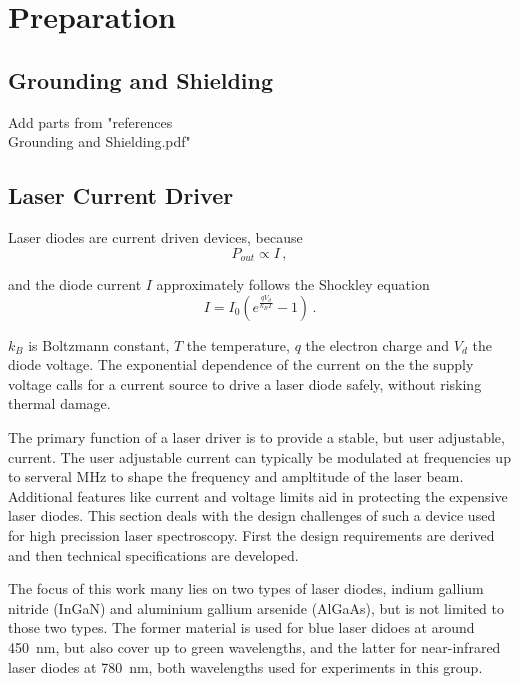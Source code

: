 \chapter{Preparation}
\section{Grounding and Shielding}
Add parts from "references\\Grounding and Shielding.pdf"
\section{Laser Current Driver}
Laser diodes are current driven devices, because
\begin{equation}
    P_{out} \propto I\,, \nonumber
\end{equation}

and the diode current $I$ approximately follows the Shockley equation \cite{shockley_diode}
\begin{equation}
    I = I_0 \left( e^{\frac{qV_d}{k_B T}} - 1\right) \, .
\end{equation}

$k_B$ is Boltzmann constant, $T$ the temperature, $q$ the electron charge and $V_d$ the diode voltage. The exponential dependence of the current on the the supply voltage calls for a current source to drive a laser diode safely, without risking thermal damage.

The primary function of a laser driver is to provide a stable, but user adjustable, current. The user adjustable current can typically be modulated at frequencies up to serveral \unit{\MHz} to shape the frequency and ampltitude of the laser beam. Additional features like current and voltage limits aid in protecting the expensive laser diodes. This section deals with the design challenges of such a device used for high precission laser spectroscopy. First the design requirements are derived and then technical specifications are developed.

The focus of this work many lies on two types of laser diodes, indium gallium nitride (InGaN) and aluminium gallium arsenide (AlGaAs), but is not limited to those two types. The former material is used for blue laser didoes at around \qty{450}{\nm}, but also cover up to green wavelengths, and the latter for near-infrared laser diodes at \qty{780}{\nm}, both wavelengths used for experiments in this group.

